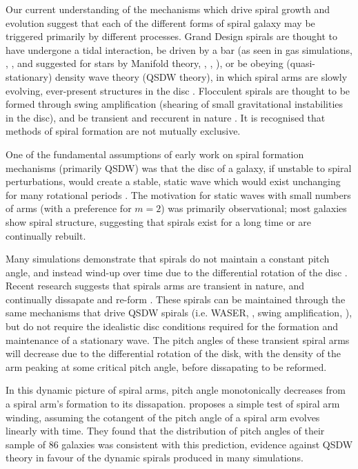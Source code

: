 Our current understanding of the mechanisms which drive spiral growth and evolution suggest that each of the different forms of spiral galaxy may be triggered primarily by different processes. Grand Design spirals are thought to have undergone a tidal interaction, be driven by a bar (as seen in gas simulations, \citealt{1976ApJ...209...53S}, \citealt{2008A&A...489..115R}, and suggested for stars by Manifold theory, \citealt{2006A&A...453...39R}, \citealt{2009MNRAS.394...67A}, \citealt{2009MNRAS.400.1706A}), or be obeying (quasi-stationary) density wave theory (QSDW theory), in which spiral arms are slowly evolving, ever-present structures in the disc \citep{1964ApJ...140..646L}. Flocculent spirals are thought to be formed through swing amplification (shearing of small gravitational instabilities in the disc), and be transient and reccurent in nature \citep{1966ApJ...146..810J}. It is recognised that methods of spiral formation are not mutually exclusive.

One of the fundamental assumptions of early work on spiral formation mechanisms (primarily QSDW) was that the disc of a galaxy, if unstable to spiral perturbations, would create a stable, static wave which would exist unchanging for many rotational periods \citep{1964ApJ...140..646L}. The motivation for static waves with small numbers of arms (with a preference for $m=2$) was primarily observational; most galaxies show spiral structure, suggesting that spirals exist for a long time or are continually rebuilt.

Many simulations demonstrate that spirals do not maintain a constant pitch angle, and instead wind-up over time due to the differential rotation of the disc \citep{2013ApJ...763...46B}. Recent research suggests that spirals arms are transient in nature, and continually dissapate and re-form \citep{2014PASA...31...35D}. These spirals can be maintained through the same mechanisms that drive QSDW spirals (i.e. WASER, \citealt{1976ApJ...205..363M}, swing amplification, \citealt{1965MNRAS.130..125G}), but do not require the idealistic disc conditions required for the formation and maintenance of a stationary wave. The pitch angles of these transient spiral arms will decrease due to the differential rotation of the disk, with the density of the arm peaking at some critical pitch angle, before dissapating to be reformed.

In this dynamic picture of spiral arms, pitch angle monotonically decreases from a spiral arm's formation to its dissapation. \citet{2019arXiv190910291P} proposes a simple test of spiral arm winding, assuming the cotangent of the pitch angle of a spiral arm evolves linearly with time. They found that the distribution of pitch angles of their sample of 86 galaxies was consistent with this prediction, evidence against QSDW theory in favour of the dynamic spirals produced in many simulations.

